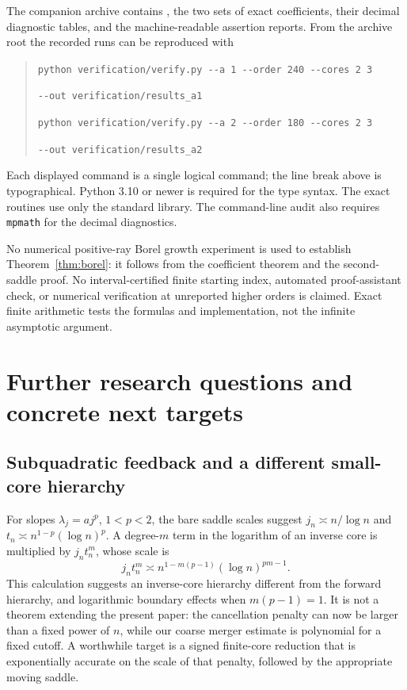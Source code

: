 \documentclass[11pt,a4paper]{article}
\numberwithin{equation}{section}
\theoremstyle{definition}
\theoremstyle{remark}
\begin{document}
The companion archive contains , the two
sets of exact coefficients, their decimal diagnostic tables, and the
machine-readable assertion reports. From the archive root the recorded
runs can be reproduced with
\begin{quote}\small
\verb|python verification/verify.py --a 1 --order 240 --cores 2 3|\par
\hspace*{1em}\verb|--out verification/results_a1|\par\medskip
\verb|python verification/verify.py --a 2 --order 180 --cores 2 3|\par
\hspace*{1em}\verb|--out verification/results_a2|
\end{quote}
Each displayed command is a single logical command; the line break above
is typographical. Python 3.10 or newer is required for the type syntax.
The exact routines use only the standard library. The command-line audit
also requires \texttt{mpmath} for the decimal diagnostics.

No numerical positive-ray Borel growth experiment is used to establish
Theorem~\ref{thm:borel}: it follows from the coefficient theorem and the
second-saddle proof. No interval-certified finite starting index, automated
proof-assistant check, or numerical verification at unreported higher
orders is claimed. Exact finite arithmetic tests the formulas and
implementation, not the infinite asymptotic argument.

\section{Further research questions and concrete next targets}
\label{sec:research}

\subsection{Subquadratic feedback and a different small-core hierarchy}

For slopes $\lambda_j=a j^p$, $1<p<2$, the bare saddle scales suggest
$j_n\asymp n/\log n$ and
$t_n\asymp n^{1-p}(\log n)^p$. A degree-$m$ term in the logarithm of an
inverse core is multiplied by $j_nt_n^m$, whose scale is
\begin{equation}
 j_nt_n^m\asymp
 n^{1-m(p-1)}(\log n)^{pm-1}.
 \label{eq:subquadratic-diagnostic}
\end{equation}
This calculation suggests an inverse-core hierarchy different from the
forward hierarchy, and logarithmic boundary effects when $m(p-1)=1$.
It is not a theorem extending the present paper: the cancellation penalty
can now be larger than a fixed power of $n$, while our coarse merger
estimate is polynomial for a fixed cutoff. A worthwhile target is a
signed finite-core reduction that is exponentially accurate on the scale
of that penalty, followed by the appropriate moving saddle.
\end{document}
